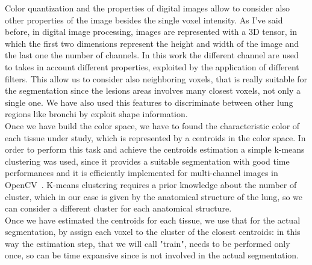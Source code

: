 	Color quantization and the properties of digital images allow to consider also other properties of the image besides the single voxel intensity.
	As I've said before, in digital image processing, images are represented with a 3D tensor, in which the first two dimensions represent the height and width of the image  and the last one the number of channels. In this work the different channel are used to takes in account different properties, exploited by the application of different filters. This allow us to consider also neighboring voxels, that is really suitable for the segmentation since the  lesions areas involves many closest voxels, not only a single one. We have also used this features to discriminate between other lung regions like bronchi by exploit shape information.\\
	
	Once we have build the color space, we have to found the characteristic color of each tissue under study, which is represented by a centroids in the color space. In order to perform this task and achieve the centroids estimation a simple k-means clustering was used, since it provides a suitable segmentation with good time performances and it is efficiently implemented for multi-channel images in OpenCV~\cite{OpenCV}. 
	K-means clustering requires a prior knowledge about the number of cluster, which in our case is given by the anatomical structure of the lung, so we can consider a different cluster for each anatomical structure.\\
	Once we have estimated the centroids for each tissue, we use that for the actual segmentation, by assign each voxel to the cluster of the closest centroids: in this way the estimation step, that we will call "train", needs to be performed only once, so can be time expansive since is not involved in the actual segmentation.\\
	
